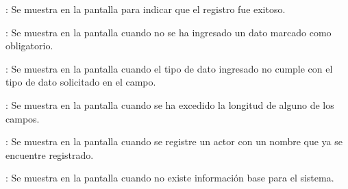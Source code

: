 \begin{Citemize}
	\item {}: Se muestra en la pantalla  para indicar que el registro fue exitoso.
	\item {}: Se muestra en la pantalla  cuando no se ha ingresado un dato marcado como obligatorio.
	\item {}: Se muestra en la pantalla  cuando el tipo de dato ingresado no cumple con el tipo de dato solicitado en el campo.
	\item {}: Se muestra en la pantalla  cuando se ha excedido la longitud de alguno de los campos.
	\item {}: Se muestra en la pantalla  cuando se registre un actor con un nombre que ya se encuentre registrado.
	\item {}: Se muestra en la pantalla  cuando no existe información base para el sistema.
\end{Citemize}
